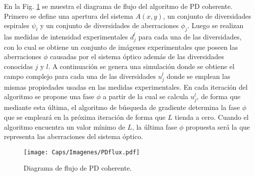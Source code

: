 En la Fig. \ref{fig:pdflux} se muestra el diagrama de flujo del algoritmo de PD coherente. Primero se define una apertura del sistema $A(x,y)$, un conjunto de diversidades espirales $\psi_l$ y un conjunto de diversidades de aberraciones $\phi_j$. Luego se realizan las medidas de intensidad experimentales $d_{j}^l$ para cada una de las diversidades, con lo cual se obtiene un conjunto de imágenes experimentales que poseen las aberraciones $\phi$ causadas por el sistema óptico además de las diversidades conocidas $j$ y $l$. A continuación se genera una simulación donde se obtiene el campo complejo para cada una de las diversidades $u_{j}^l$ donde se emplean las mismas propiedades usadas en las medidas experimentales. En cada iteración del algoritmo se propone una fase $\phi$ a partir de la cual se calcula $u_{j}^l$, de forma que mediante esta última, el algoritmo de búsqueda de gradiente determina la fase $\phi$ que se empleará en la próxima iteración de forma que $L$ tienda a cero. Cuando el algoritmo encuentra un valor mínimo de $L$, la última fase $\phi$ propuesta será la que representa las aberraciones del sistema óptico.\\



\begin{figure}[!ht]
  \centering
    \texttt{[image: Caps/Imagenes/PDflux.pdf]}
  \caption{Diagrama de flujo de PD coherente.}
  \label{fig:pdflux}
\end{figure}

